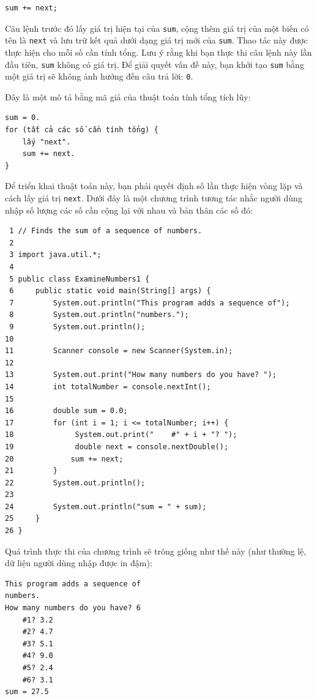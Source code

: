\begin{verbatim}
sum += next;
\end{verbatim}

Câu lệnh trước đó lấy giá trị hiện tại của \texttt{sum}, cộng thêm giá
trị của một biến có tên là \texttt{next} và lưu trữ kết quả dưới dạng
giá trị mới của \texttt{sum}. Thao tác này được thực hiện cho mỗi số cần
tính tổng. Lưu ý rằng khi bạn thực thi câu lệnh này lần đầu tiên,
\texttt{sum} không có giá trị. Để giải quyết vấn đề này, bạn khởi tạo
\texttt{sum} bằng một giá trị sẽ không ảnh hưởng đến câu trả lời:
\texttt{0}.

Đây là một mô tả bằng mã giả của thuật toán tính tổng tích lũy:

\begin{verbatim}
sum = 0.
for (tất cả các số cần tính tổng) {
    lấy "next".
    sum += next.
}
\end{verbatim}

Để triển khai thuật toán này, bạn phải quyết định số lần thực hiện vòng
lặp và cách lấy giá trị \texttt{next}. Dưới đây là một chương trình
tương tác nhắc người dùng nhập số lượng các số cần cộng lại với nhau và
bản thân các số đó:

\begin{verbatim}
 1 // Finds the sum of a sequence of numbers.
 2
 3 import java.util.*;
 4
 5 public class ExamineNumbers1 {
 6     public static void main(String[] args) {
 7         System.out.println("This program adds a sequence of");
 8         System.out.println("numbers.");
 9         System.out.println();
10
11         Scanner console = new Scanner(System.in);
12
13         System.out.print("How many numbers do you have? ");
14         int totalNumber = console.nextInt();
15
16         double sum = 0.0;
17         for (int i = 1; i <= totalNumber; i++) {
18              System.out.print("    #" + i + "? ");
19              double next = console.nextDouble();
20             sum += next;
21         }
22         System.out.println();
23
24         System.out.println("sum = " + sum);
25     }
26 }
\end{verbatim}

Quá trình thực thi của chương trình sẽ trông giống như thế này (như
thường lệ, dữ liệu người dùng nhập được in đậm):

\begin{verbatim}
This program adds a sequence of 
numbers. 
How many numbers do you have? 6  
    #1? 3.2  
    #2? 4.7  
    #3? 5.1  
    #4? 9.0  
    #5? 2.4  
    #6? 3.1  
sum = 27.5
\end{verbatim}

